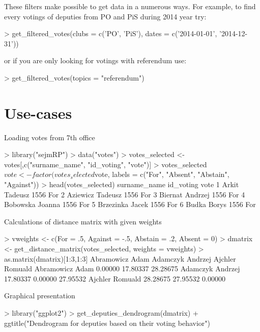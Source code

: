 These filters make possible to get data in a numerous ways. For example, to find every votings of deputies from PO and PiS during 2014 year try:

\begin{example}
> get_filtered_votes(clubs = c('PO', 'PiS'), dates = c('2014-01-01', '2014-12-31'))
\end{example}

or if you are only looking for votings with referendum use:

\begin{example}
> get_filtered_votes(topics = "referendum")
\end{example}

\section{Use-cases}


Loading votes from 7th office

\begin{example}
> library("sejmRP")
> data("votes")
> votes_selected <- votes[,c("surname_name", "id_voting", "vote")]
> votes_selected$vote <- factor(votes_selected$vote, labels = c("For", "Absent", "Abstain", "Against"))
> head(votes_selected)
        surname_name id_voting vote
1      Arkit Tadeusz      1556   For
2   Aziewicz Tadeusz      1556   For
3    Biernat Andrzej      1556   For
4    Bobowska Joanna      1556   For
5    Brzezinka Jacek      1556   For
6        Budka Borys      1556   For
\end{example}

Calculations of distance matrix with given weights

\begin{example}
> vweights <- c(For = .5, Against = -.5, Abstain = .2, Absent = 0)
> dmatrix <- get_distance_matrix(votes_selected, weights = vweights)
> as.matrix(dmatrix)[1:3,1:3]
                 Abramowicz Adam Adamczyk Andrzej Ajchler Romuald
Abramowicz Adam          0.00000         17.80337        28.28675
Adamczyk Andrzej        17.80337          0.00000        27.95532
Ajchler Romuald         28.28675         27.95532         0.00000
\end{example}

Graphical presentation

\begin{example}
> library("ggplot2")
> get_deputies_dendrogram(dmatrix) + ggtitle("Dendrogram for deputies based on their voting behavior")
\end{example}

